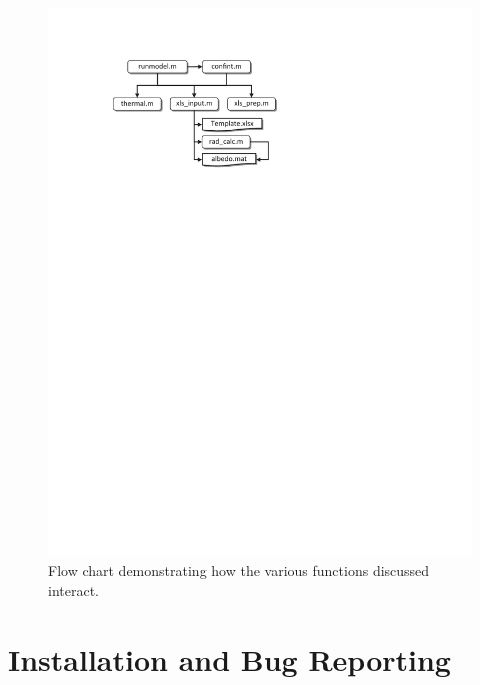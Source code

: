 \begin{figure}[ht!]\centering
\includegraphics{figures/flow.pdf}
\caption{Flow chart demonstrating how the various functions discussed interact.}
\label{TM:fig:flow}
\end{figure}

\section{Installation and Bug Reporting}